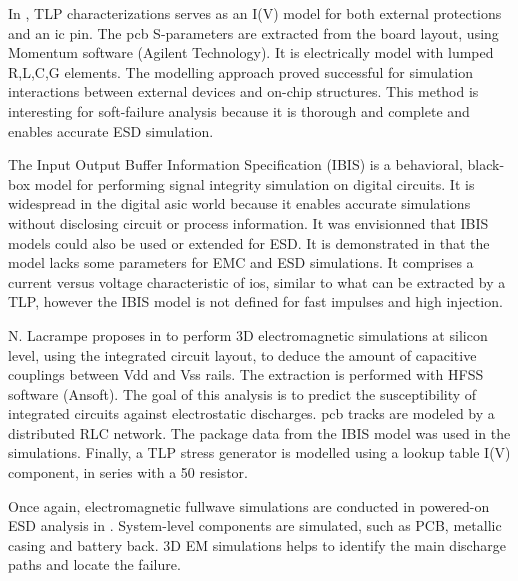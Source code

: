 In \cite{usb2ESDProtection}, TLP characterizations serves as an I(V) model for both external protections and an \gls{ic} pin.
The \gls{pcb} S-parameters are extracted from the board layout, using Momentum software (Agilent Technology).
It is electrically model with lumped R,L,C,G elements.
The modelling approach proved successful for simulation interactions between external devices and on-chip structures.
This method is interesting for soft-failure analysis because it is thorough and complete and enables accurate ESD simulation.

The Input Output Buffer Information Specification (IBIS) \cite{ibis-spec} is a behavioral, black-box model for performing signal integrity simulation on digital circuits.
It is widespread in the digital \gls{asic} world because it enables accurate simulations without disclosing circuit or process information.
It was envisionned that IBIS models could also be used or extended for ESD.
It is demonstrated in \cite{ibisImprovementFabrice} that the model lacks some parameters for EMC and ESD simulations.
It comprises a current versus voltage characteristic of \gls{io}s, similar to what can be extracted by a TLP, however the IBIS model is not defined for fast impulses and high injection.

N. Lacrampe proposes in \cite{LacrampeTransientImmunity} to perform 3D electromagnetic simulations at silicon level, using the integrated circuit layout, to deduce the amount of capacitive couplings between Vdd and Vss rails.
The extraction is performed with HFSS software (Ansoft).
The goal of this analysis is to predict the susceptibility of integrated circuits against electrostatic discharges.
\gls{pcb} tracks are modeled by a distributed RLC network.
The package data from the IBIS model \cite{ibis-spec} was used in the simulations.
Finally, a TLP stress generator is modelled using a lookup table I(V) component, in series with a 50\textOmega{} resistor.

Once again, electromagnetic fullwave simulations are conducted in powered-on ESD analysis in \cite{softFailMobile}.
System-level components are simulated, such as PCB, metallic casing and battery back.
3D EM simulations helps to identify the main discharge paths and locate the failure.
